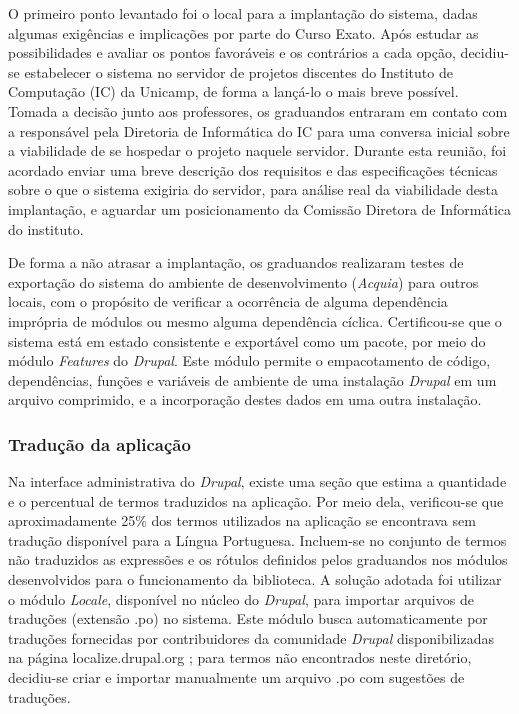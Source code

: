 \documentclass[a4paper]{article}
\begin{document}
O primeiro ponto levantado foi o local para a implantação do sistema, dadas algumas exigências e implicações por parte do Curso Exato. Após estudar as possibilidades e avaliar os pontos favoráveis e os contrários a cada opção, decidiu-se estabelecer o sistema no servidor de projetos discentes do Instituto de Computação (IC) da Unicamp, de forma a lançá-lo o mais breve possível. Tomada a decisão junto aos professores, os graduandos entraram em contato com a responsável pela Diretoria de Informática do IC para uma conversa inicial sobre a viabilidade de se hospedar o projeto naquele servidor. Durante esta reunião, foi acordado enviar uma breve descrição dos requisitos e das especificações técnicas sobre o que o sistema exigiria do servidor, para análise real da viabilidade desta implantação, e aguardar um posicionamento da Comissão Diretora de Informática do instituto.

De forma a não atrasar a implantação, os graduandos realizaram testes de exportação do sistema do ambiente de desenvolvimento (\textit{Acquia}) para outros locais, com o propósito de verificar a ocorrência de alguma dependência imprópria de módulos ou mesmo alguma dependência cíclica. Certificou-se que o sistema está em estado consistente e exportável como um pacote, por meio do módulo \textit{Features} do \textit{Drupal}. Este módulo permite o empacotamento de código, dependências, funções e variáveis de ambiente de uma instalação \textit{Drupal} em um arquivo comprimido, e a incorporação destes dados em uma outra instalação.

\subsubsection{Tradução da aplicação}

Na interface administrativa do \textit{Drupal}, existe uma seção que estima a quantidade e o percentual de termos traduzidos na aplicação. Por meio dela, verificou-se que aproximadamente 25\% dos termos utilizados na aplicação se encontrava sem tradução disponível para a Língua Portuguesa. Incluem-se no conjunto de termos não traduzidos as expressões e os rótulos definidos pelos graduandos nos módulos desenvolvidos para o funcionamento da biblioteca. A solução adotada foi utilizar o módulo \textit{Locale}, disponível no núcleo do \textit{Drupal}, para importar arquivos de traduções (extensão .po) no sistema. Este módulo busca automaticamente por traduções fornecidas por contribuidores da comunidade \textit{Drupal} disponibilizadas na página localize.drupal.org \cite{localize}; para termos não encontrados neste diretório, decidiu-se criar e importar manualmente um arquivo .po com sugestões de traduções.
\end{document}
